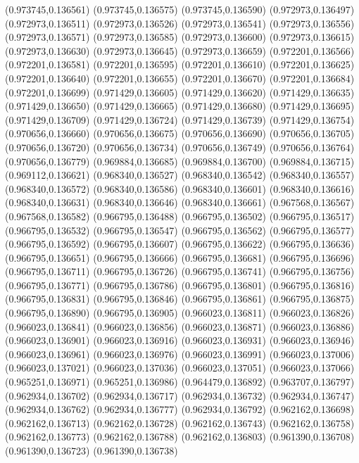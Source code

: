 (0.973745,0.136561)
(0.973745,0.136575)
(0.973745,0.136590)
(0.972973,0.136497)
(0.972973,0.136511)
(0.972973,0.136526)
(0.972973,0.136541)
(0.972973,0.136556)
(0.972973,0.136571)
(0.972973,0.136585)
(0.972973,0.136600)
(0.972973,0.136615)
(0.972973,0.136630)
(0.972973,0.136645)
(0.972973,0.136659)
(0.972201,0.136566)
(0.972201,0.136581)
(0.972201,0.136595)
(0.972201,0.136610)
(0.972201,0.136625)
(0.972201,0.136640)
(0.972201,0.136655)
(0.972201,0.136670)
(0.972201,0.136684)
(0.972201,0.136699)
(0.971429,0.136605)
(0.971429,0.136620)
(0.971429,0.136635)
(0.971429,0.136650)
(0.971429,0.136665)
(0.971429,0.136680)
(0.971429,0.136695)
(0.971429,0.136709)
(0.971429,0.136724)
(0.971429,0.136739)
(0.971429,0.136754)
(0.970656,0.136660)
(0.970656,0.136675)
(0.970656,0.136690)
(0.970656,0.136705)
(0.970656,0.136720)
(0.970656,0.136734)
(0.970656,0.136749)
(0.970656,0.136764)
(0.970656,0.136779)
(0.969884,0.136685)
(0.969884,0.136700)
(0.969884,0.136715)
(0.969112,0.136621)
(0.968340,0.136527)
(0.968340,0.136542)
(0.968340,0.136557)
(0.968340,0.136572)
(0.968340,0.136586)
(0.968340,0.136601)
(0.968340,0.136616)
(0.968340,0.136631)
(0.968340,0.136646)
(0.968340,0.136661)
(0.967568,0.136567)
(0.967568,0.136582)
(0.966795,0.136488)
(0.966795,0.136502)
(0.966795,0.136517)
(0.966795,0.136532)
(0.966795,0.136547)
(0.966795,0.136562)
(0.966795,0.136577)
(0.966795,0.136592)
(0.966795,0.136607)
(0.966795,0.136622)
(0.966795,0.136636)
(0.966795,0.136651)
(0.966795,0.136666)
(0.966795,0.136681)
(0.966795,0.136696)
(0.966795,0.136711)
(0.966795,0.136726)
(0.966795,0.136741)
(0.966795,0.136756)
(0.966795,0.136771)
(0.966795,0.136786)
(0.966795,0.136801)
(0.966795,0.136816)
(0.966795,0.136831)
(0.966795,0.136846)
(0.966795,0.136861)
(0.966795,0.136875)
(0.966795,0.136890)
(0.966795,0.136905)
(0.966023,0.136811)
(0.966023,0.136826)
(0.966023,0.136841)
(0.966023,0.136856)
(0.966023,0.136871)
(0.966023,0.136886)
(0.966023,0.136901)
(0.966023,0.136916)
(0.966023,0.136931)
(0.966023,0.136946)
(0.966023,0.136961)
(0.966023,0.136976)
(0.966023,0.136991)
(0.966023,0.137006)
(0.966023,0.137021)
(0.966023,0.137036)
(0.966023,0.137051)
(0.966023,0.137066)
(0.965251,0.136971)
(0.965251,0.136986)
(0.964479,0.136892)
(0.963707,0.136797)
(0.962934,0.136702)
(0.962934,0.136717)
(0.962934,0.136732)
(0.962934,0.136747)
(0.962934,0.136762)
(0.962934,0.136777)
(0.962934,0.136792)
(0.962162,0.136698)
(0.962162,0.136713)
(0.962162,0.136728)
(0.962162,0.136743)
(0.962162,0.136758)
(0.962162,0.136773)
(0.962162,0.136788)
(0.962162,0.136803)
(0.961390,0.136708)
(0.961390,0.136723)
(0.961390,0.136738)
